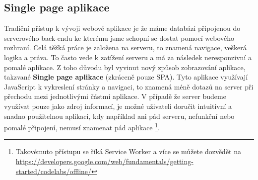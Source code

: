 \subsection{Single page aplikace}
\par Tradiční přístup k vývoji webové aplikace je že máme databázi připojenou do serverového back-endu ke kterému jsme schopní se dostat pomocí webového rozhraní. Celá těžká práce je založena na serveru, to znamená navigace, veškerá logika a práva. To často vede k zatížení serveru a má za následek neresponzivní a pomalé aplikace. Z toho důvodu byl vyvinut nový způsob zobrazování aplikace, takzvané \textbf{Single page aplikace} (zkráceně pouze SPA). Tyto aplikace využívají JavaScript k vykreslení stránky a navigaci, to znamená méně dotazů na server při přechodu mezi jednotlivými částmi aplikace. V případě že server budeme využívat pouze jako zdroj informací, je možné uživateli doručit intuitivní a snadno použitelnou aplikaci, kdy například ani pád serveru, nefunkční nebo pomalé připojení, nemusí znamenat pád aplikace \footnote{Takovémuto přístupu se říká Service Worker a více se můžete dozvědět na \url{https://developers.google.com/web/fundamentals/getting-started/codelabs/offline/}}. \cite{serverless-singlepage-apps}


